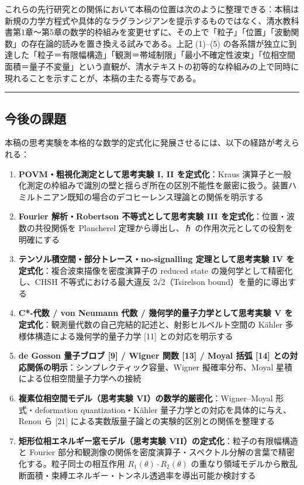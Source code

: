 \documentclass[
]{ltjsarticle}
\providecommand{\tightlist}{%
  \setlength{\itemsep}{0pt}\setlength{\parskip}{0pt}}
\begin{document}
これらの先行研究との関係において本稿の位置は次のように整理できる：本稿は新規の力学方程式や具体的なラグランジアンを提示するものではなく、清水教科書第1章〜第5章の数学的枠組みを変更せずに、その上で「粒子」「位置」「波動関数」の存在論的読みを置き換える試みである。上記
(1)--(5)
の各系譜が独立に到達した「粒子＝有限幅構造」「観測＝帯域制限」「最小不確定性波束」「位相空間面積＝量子不変量」という直観が、清水テキストの初等的な枠組みの上で同時に現れることを示すことが、本稿の主たる寄与である。

\begin{center}\rule{0.5\linewidth}{0.5pt}\end{center}

\subsection{今後の課題}\label{ux4ecaux5f8cux306eux8ab2ux984c}

本稿の思考実験を本格的な数学的定式化に発展させるには、以下の経路が考えられる：

\begin{enumerate}
\def\labelenumi{\arabic{enumi}.}
\tightlist
\item
  \textbf{POVM・粗視化測定として思考実験 I, II を定式化}：Kraus
  演算子と一般化測定の枠組みで識別の壁と揺らぎ所在の区別不能性を厳密に扱う。装置ハミルトニアン既知の場合のデコヒーレンス理論との関係を明示する
\item
  \textbf{Fourier 解析・Robertson 不等式として思考実験 III
  を定式化}：位置・波数の共役関係を Plancherel 定理から導出し、ℏ
  の作用次元としての役割を明確にする
\item
  \textbf{テンソル積空間・部分トレース・no-signalling 定理として思考実験
  IV を定式化}：複合波束描像を密度演算子の reduced state
  の幾何学として精密化し、CHSH 不等式における最大違反 2√2（Tsirelson
  bound）を量的に導出する
\item
  \textbf{C*-代数 / von Neumann 代数 / 幾何学的量子力学として思考実験 V
  を定式化}：観測量代数の自己完結的記述と、射影ヒルベルト空間の Kähler
  多様体構造による幾何学的量子力学 {[}11{]} との対応を明示する
\item
  \textbf{de Gosson 量子ブロブ {[}9{]} / Wigner 関数 {[}13{]} / Moyal
  括弧 {[}14{]} との対応関係の明示}：シンプレクティック容量、Wigner
  擬確率分布、Moyal 星積による位相空間量子力学への接続
\item
  \textbf{複素位相空間モデル（思考実験
  VI）の数学的厳密化}：Wigner--Moyal 形式・deformation
  quantization・Kähler 量子力学との対応を具体的に与え、Renou ら {[}21{]}
  による実数版量子論との実験的区別との関係を整理する
\item
  \textbf{矩形位相エネルギー窓モデル（思考実験
  VII）の定式化}：粒子の有限幅構造と Fourier
  部分和観測像の関係を密度演算子・スペクトル分解の言葉で精密化する。粒子同士の相互作用
  \(R_1(\theta)\cdot R_2(\theta)\)
  の重なり領域モデルから散乱断面積・束縛エネルギー・トンネル透過率を導出可能か検討する
\end{enumerate}
\end{document}
